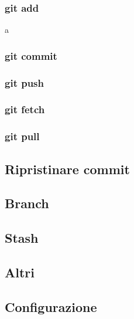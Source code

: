 \subsubsection{git add}
a
\subsubsection{git commit}
\subsubsection{git push}
\subsubsection{git fetch}
\subsubsection{git pull}


\subsection{Ripristinare commit}



\subsection{Branch}



\subsection{Stash}



\subsection{Altri}



\subsection{Configurazione}


